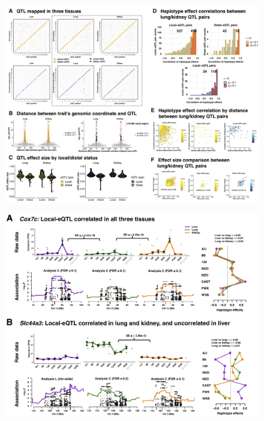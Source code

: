 \documentclass[10pt,letterpaper]{article}
\begin{document}
\newpage

\begin{figure}[hp]
\includegraphics[width=\textwidth, trim={0in 0in 0in 0in}, clip]{figs/mapping_results_revision.png}
\caption{}
\end{figure}

\newpage

\begin{figure}[hp]
\includegraphics[width=\textwidth, trim={0in 0in 0in 0in}, clip]{figs/correlated_local_eqtl_update.png}
\caption{}
\end{figure}

\newpage
\end{document}
